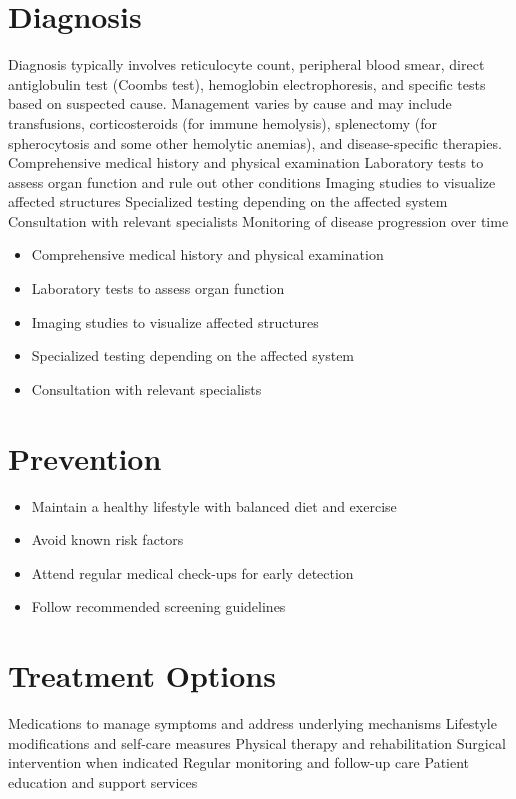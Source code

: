 \section{Diagnosis}
Diagnosis typically involves reticulocyte count, peripheral blood smear, direct antiglobulin test (Coombs test), hemoglobin electrophoresis, and specific tests based on suspected cause. Management varies by cause and may include transfusions, corticosteroids (for immune hemolysis), splenectomy (for spherocytosis and some other hemolytic anemias), and disease-specific therapies. Comprehensive medical history and physical examination Laboratory tests to assess organ function and rule out other conditions Imaging studies to visualize affected structures Specialized testing depending on the affected system Consultation with relevant specialists Monitoring of disease progression over time

\begin{itemize}[noitemsep]
  \item Comprehensive medical history and physical examination
  \item Laboratory tests to assess organ function
  \item Imaging studies to visualize affected structures
  \item Specialized testing depending on the affected system
  \item Consultation with relevant specialists
\end{itemize}
\section{Prevention}
\begin{itemize}[noitemsep]
  \item Maintain a healthy lifestyle with balanced diet and exercise
  \item Avoid known risk factors
  \item Attend regular medical check-ups for early detection
  \item Follow recommended screening guidelines
\end{itemize}
\section{Treatment Options}
Medications to manage symptoms and address underlying mechanisms Lifestyle modifications and self-care measures Physical therapy and rehabilitation Surgical intervention when indicated Regular monitoring and follow-up care Patient education and support services

